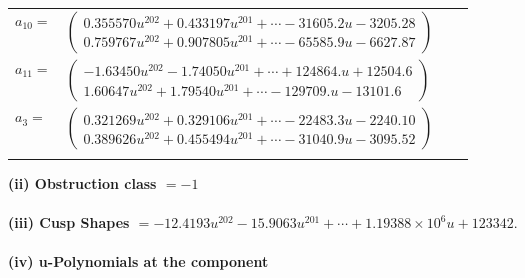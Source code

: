 \documentclass[1p]{elsarticle_modified}
\theoremstyle{definition}
\begin{document}
\begin{tabular}{m{7pt} m{180pt} m{7pt} m{180pt} }
\flushright $a_{10}=$&$\begin{pmatrix}0.355570 u^{202}+0.433197 u^{201}+\cdots-31605.2 u-3205.28\\0.759767 u^{202}+0.907805 u^{201}+\cdots-65585.9 u-6627.87\end{pmatrix}$ \\
\flushright $a_{11}=$&$\begin{pmatrix}-1.63450 u^{202}-1.74050 u^{201}+\cdots+124864. u+12504.6\\1.60647 u^{202}+1.79540 u^{201}+\cdots-129709. u-13101.6\end{pmatrix}$ \\
\flushright $a_{3}=$&$\begin{pmatrix}0.321269 u^{202}+0.329106 u^{201}+\cdots-22483.3 u-2240.10\\0.389626 u^{202}+0.455494 u^{201}+\cdots-31040.9 u-3095.52\end{pmatrix}$\\&\end{tabular}
\flushleft \textbf{(ii) Obstruction class $= -1$}\\~\\
\flushleft \textbf{(iii) Cusp Shapes $= -12.4193 u^{202}-15.9063 u^{201}+\cdots+1.19388\times10^{6} u+123342.$}\\~\\
\newpage\renewcommand{\arraystretch}{1}
\flushleft \textbf{(iv) u-Polynomials at the component}\newline \\
\end{document}

